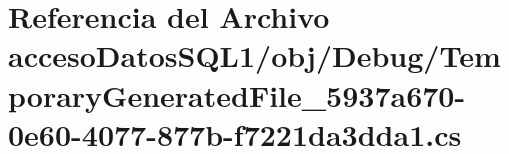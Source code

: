 \hypertarget{acceso_datos_s_q_l1_2obj_2_debug_2_temporary_generated_file__5937a670-0e60-4077-877b-f7221da3dda1_8cs}{}\section{Referencia del Archivo acceso\+Datos\+S\+Q\+L1/obj/\+Debug/\+Temporary\+Generated\+File\+\_\+5937a670-\/0e60-\/4077-\/877b-\/f7221da3dda1.cs}
\label{acceso_datos_s_q_l1_2obj_2_debug_2_temporary_generated_file__5937a670-0e60-4077-877b-f7221da3dda1_8cs}

